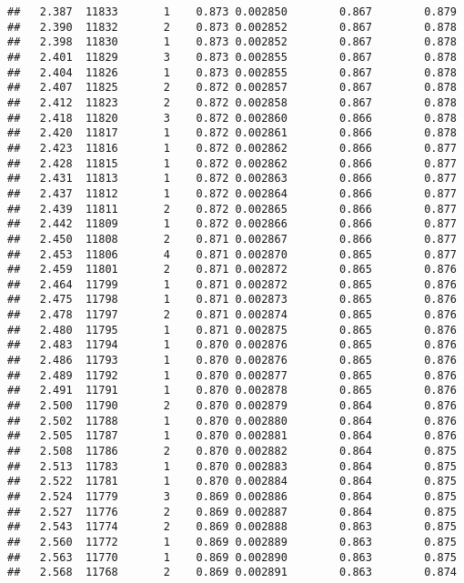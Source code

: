 \documentclass[
]{book}
\begin{document}
\begin{verbatim}
##   2.387  11833       1    0.873 0.002850        0.867        0.879
##   2.390  11832       2    0.873 0.002852        0.867        0.878
##   2.398  11830       1    0.873 0.002852        0.867        0.878
##   2.401  11829       3    0.873 0.002855        0.867        0.878
##   2.404  11826       1    0.873 0.002855        0.867        0.878
##   2.407  11825       2    0.872 0.002857        0.867        0.878
##   2.412  11823       2    0.872 0.002858        0.867        0.878
##   2.418  11820       3    0.872 0.002860        0.866        0.878
##   2.420  11817       1    0.872 0.002861        0.866        0.878
##   2.423  11816       1    0.872 0.002862        0.866        0.877
##   2.428  11815       1    0.872 0.002862        0.866        0.877
##   2.431  11813       1    0.872 0.002863        0.866        0.877
##   2.437  11812       1    0.872 0.002864        0.866        0.877
##   2.439  11811       2    0.872 0.002865        0.866        0.877
##   2.442  11809       1    0.872 0.002866        0.866        0.877
##   2.450  11808       2    0.871 0.002867        0.866        0.877
##   2.453  11806       4    0.871 0.002870        0.865        0.877
##   2.459  11801       2    0.871 0.002872        0.865        0.876
##   2.464  11799       1    0.871 0.002872        0.865        0.876
##   2.475  11798       1    0.871 0.002873        0.865        0.876
##   2.478  11797       2    0.871 0.002874        0.865        0.876
##   2.480  11795       1    0.871 0.002875        0.865        0.876
##   2.483  11794       1    0.870 0.002876        0.865        0.876
##   2.486  11793       1    0.870 0.002876        0.865        0.876
##   2.489  11792       1    0.870 0.002877        0.865        0.876
##   2.491  11791       1    0.870 0.002878        0.865        0.876
##   2.500  11790       2    0.870 0.002879        0.864        0.876
##   2.502  11788       1    0.870 0.002880        0.864        0.876
##   2.505  11787       1    0.870 0.002881        0.864        0.876
##   2.508  11786       2    0.870 0.002882        0.864        0.875
##   2.513  11783       1    0.870 0.002883        0.864        0.875
##   2.522  11781       1    0.870 0.002884        0.864        0.875
##   2.524  11779       3    0.869 0.002886        0.864        0.875
##   2.527  11776       2    0.869 0.002887        0.864        0.875
##   2.543  11774       2    0.869 0.002888        0.863        0.875
##   2.560  11772       1    0.869 0.002889        0.863        0.875
##   2.563  11770       1    0.869 0.002890        0.863        0.875
##   2.568  11768       2    0.869 0.002891        0.863        0.874

\end{verbatim}
\end{document}
